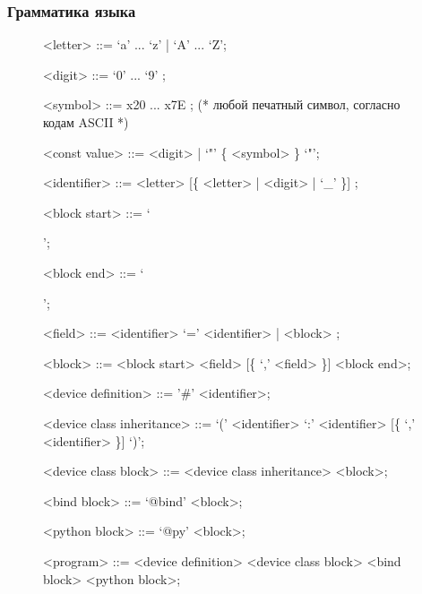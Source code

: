 \begin{frame}%
    \frametitle{Грамматика языка {\mylanguage}}
    \begin{figure}[!htbp]
        \begin{adjustbox}{max totalsize={\textwidth}{\textheight}}
            \begin{minipage}{\linewidth}
                {\footnotesize
                \setlength{\grammarparsep}{0.02cm}
                \setlength{\grammarindent}{13em}
                \begin{grammar}{}
                    <letter> ::= `a' ... `z' | `A' ... `Z';

                    <digit> ::= `0' ... `9' ;

                    <symbol> ::= x20 ... x7E ; (* любой печатный символ, согласно кодам ASCII *)

                    <const value> ::= <digit> | `"' \{ <symbol> \} `"';

                    <identifier> ::= <letter> [\{ <letter> | <digit> | `\_' \}] ;

                    <block start> ::= `{';

                    <block end> ::= `}';

                    <field> ::= <identifier> `=' <identifier> | <block> ;

                    <block> ::= <block start> <field> [\{ `,' <field> \}] <block end>;

                    <device definition> ::= '\#' <identifier>;

                    <device class inheritance> ::= `(' <identifier> `:' <identifier> [\{ `,' <identifier> \}] `)';

                    <device class block> ::= <device class inheritance> <block>;

                    <bind block> ::= `@bind' <block>;

                    <python block> ::= `@py' <block>;

                    <program> ::= <device definition> <device class block> <bind block> <python block>;
                \end{grammar}
                }
            \end{minipage}
        \end{adjustbox}
    \end{figure}
\end{frame}


